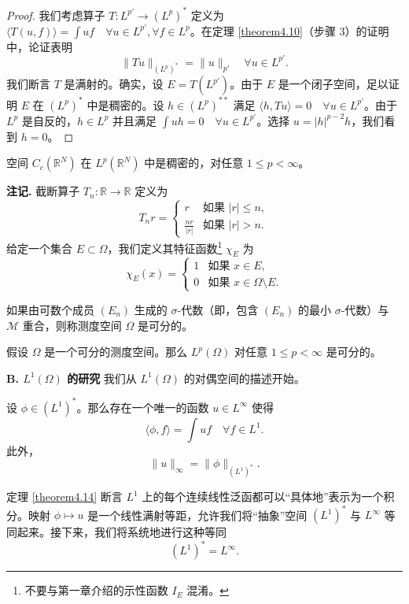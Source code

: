 \begin{proof}
我们考虑算子 $T: L^{p'} \to (L^p)^*$ 定义为 $\langle T(u, f) \rangle = \int uf \quad \forall u \in L^{p'}, \forall f \in L^p$。在定理 \ref{theorem4.10}（步骤 3）的证明中，论证表明
\[ \|Tu\|_{(L^p)^*} = \|u\|_{p'} \quad \forall u \in L^{p'}. \]
我们断言 $T$ 是满射的。确实，设 $E=T(L^{p'})$。由于 $E$ 是一个闭子空间，足以证明 $E$ 在 $(L^p)^*$ 中是稠密的。设 $h \in (L^p)^{**}$ 满足 $\langle h, Tu \rangle = 0 \quad \forall u \in L^{p'}$。由于 $L^p$ 是自反的，$h \in L^p$ 并且满足 $\int uh = 0 \quad \forall u \in L^{p'}$。选择 $u = |h|^{p-2}h$，我们看到 $h=0$。
\end{proof}

\begin{theorem}\label{theorem4.12}
空间 $C_c(\mathbb{R}^N)$ 在 $L^p(\mathbb{R}^N)$ 中是稠密的，对任意 $1 \le p < \infty$。
\end{theorem}

\textbf{注记.} 截断算子 $T_n: \mathbb{R} \to \mathbb{R}$ 定义为
\[ T_n r = \begin{cases} r & \text{如果 } |r| \le n, \\ \frac{nr}{|r|} & \text{如果 } |r| > n. \end{cases} \]
给定一个集合 $E \subset \Omega$，我们定义其特征函数\footnote{不要与第一章介绍的示性函数 $I_E$ 混淆。} $\chi_E$ 为
\[ \chi_E(x) = \begin{cases} 1 & \text{如果 } x \in E, \\ 0 & \text{如果 } x \in \Omega \setminus E. \end{cases} \]

\begin{definition}
如果由可数个成员 $(E_n)$ 生成的 $\sigma$-代数（即，包含 $(E_n)$ 的最小 $\sigma$-代数）与 $\mathcal{M}$ 重合，则称测度空间 $\Omega$ 是可分的。
\end{definition}

\begin{theorem}\label{theorem4.13}
假设 $\Omega$ 是一个可分的测度空间。那么 $L^p(\Omega)$ 对任意 $1 \le p < \infty$ 是可分的。
\end{theorem}

\textbf{B. $L^1(\Omega)$ 的研究}
我们从 $L^1(\Omega)$ 的对偶空间的描述开始。

\begin{theorem}\label{theorem4.14}
设 $\phi \in (L^1)^*$。那么存在一个唯一的函数 $u \in L^\infty$ 使得
\[ \langle \phi, f \rangle = \int uf \quad \forall f \in L^1. \]
此外，
\[ \|u\|_\infty = \|\phi\|_{(L^1)^*}. \]
\end{theorem}
\begin{remark}
定理 \ref{theorem4.14} 断言 $L^1$ 上的每个连续线性泛函都可以“具体地”表示为一个积分。映射 $\phi \mapsto u$ 是一个线性满射等距，允许我们将“抽象”空间 $(L^1)^*$ 与 $L^\infty$ 等同起来。接下来，我们将系统地进行这种等同
\[ (L^1)^* = L^\infty. \]
\end{remark}

